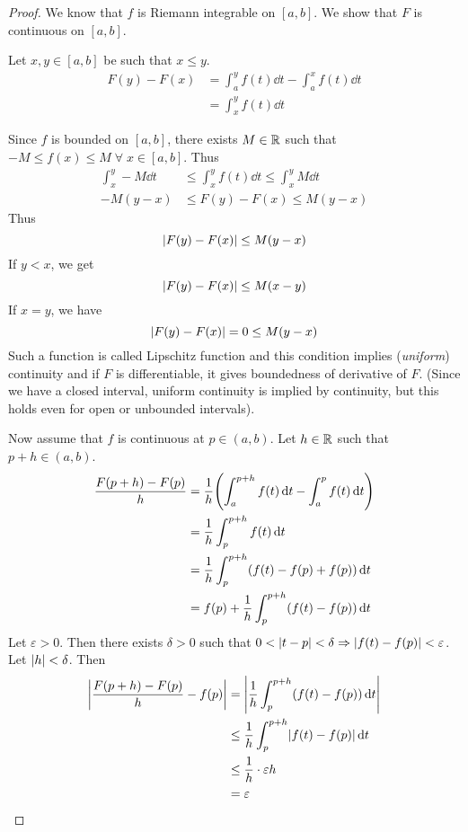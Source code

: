 \begin{proof}
    We know that $f$ is Riemann integrable on $[a, b]$. We show that $F$ is continuous on $[a, b]$.

    Let $x, y \in [a, b]$ be such that $x \leq y$.
    \begin{align*}
        F(y) - F(x) &= \int_{a}^{y} f(t) \dd t - \int_{a}^{x} f(t) \dd t \\
        &= \int_{x}^{y} f(t) \dd t
    \end{align*}

    Since $f$ is bounded on $[a, b]$, there exists $M \in \mathbb{R}$ such that $-M \leq f(x) \leq M \;\forall\; x \in [a, b]$. Thus 
    \begin{align*}
        \int_{x}^{y} -M \dd t &\leq \int_{x}^{y} f(t) \dd t \leq \int_{x}^{y} M \dd t \\
        -M(y - x) &\leq F(y) - F(x) \leq M(y - x)
    \end{align*}
    Thus \[
        \abs{F(y) - F(x)} \leq M(y - x)
    \] If $y < x$, we get \[
        \abs{F(y) - F(x)} \leq M(x - y)
    \] If $x = y$, we have \[
        \abs{F(y) - F(x)} = 0 \leq M(y - x)
    \] Such a function is called Lipschitz function and this condition implies (\emph{uniform}) continuity and if $F$ is differentiable, it gives boundedness of derivative of $F$.
    (Since we have a closed interval, uniform continuity is implied by continuity, but this holds even for open or unbounded intervals).

    Now assume that $f$ is continuous at $p \in (a, b)$. Let $h \in \mathbb{R}$ such that $p + h \in (a, b)$.
    \begin{align*}
        \frac{F(p + h) - F(p)}{h} &= \frac{1}{h} \paren{\int_{a}^{p + h} f(t) \dd t - \int_{a}^{p} f(t) \dd t} \\
        &= \frac{1}{h} \int_{p}^{p + h} f(t) \dd t \\
        &= \frac{1}{h} \int_{p}^{p+h} (f(t) - f(p) + f(p)) \dd t \\
        &= f(p) + \frac{1}{h} \int_{p}^{p+h} (f(t) - f(p)) \dd t
    \end{align*}
    Let $\varepsilon > 0$. Then there exists $\delta > 0$ such that $0 < \abs{t - p} < \delta \implies \abs{f(t) - f(p)} < \varepsilon$.
    Let $\abs{h} < \delta$. Then
    \begin{align*}
        \abs{\frac{F(p + h) - F(p)}{h} - f(p)} &= \abs{\frac{1}{h} \int_{p}^{p + h} (f(t) - f(p)) \dd t} \\
        &\leq \frac{1}{h} \int_{p}^{p + h} \abs{f(t) - f(p)} \dd t \\
        &\leq \frac{1}{h} \cdot \varepsilon h \\
        &= \varepsilon \qedhere
    \end{align*}
\end{proof}

